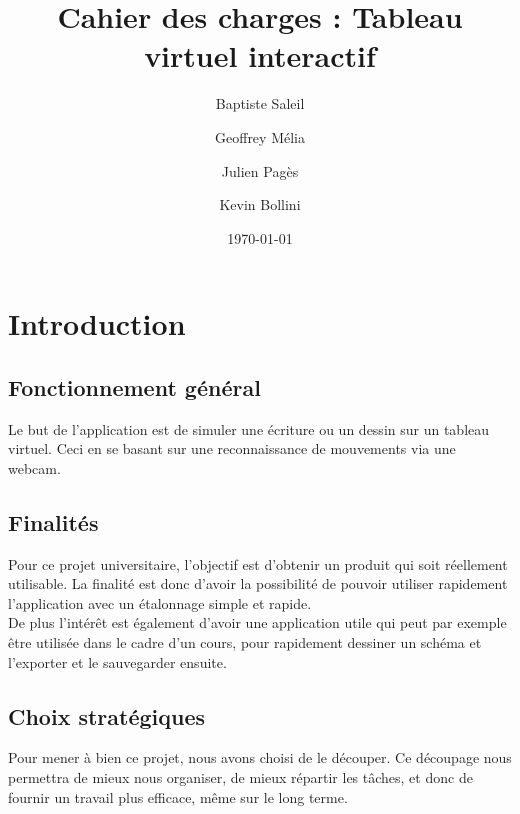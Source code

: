 \documentclass{article}
\title{Cahier des charges : Tableau virtuel interactif}
\author{Baptiste Saleil \and Geoffrey Mélia \and Julien Pagès \and Kevin Bollini}
\date{\today}
\begin{document}
	\maketitle
	\thispagestyle{empty}
	\newpage
	
	\tableofcontents
	\newpage
	
	\section{Introduction}
		\subsection{Fonctionnement général}
			Le but de l'application est de simuler une écriture ou un dessin sur un tableau virtuel. Ceci en se basant 
		sur une reconnaissance de mouvements via une webcam.
		\subsection{Finalités}
			Pour ce projet universitaire, l'objectif est d'obtenir un produit qui soit réellement utilisable.
La finalité est donc d'avoir la possibilité de pouvoir utiliser rapidement l'application avec un étalonnage simple et rapide.\\
De plus l'intérêt est également d'avoir une application utile qui peut par exemple être utilisée dans le cadre d'un cours,
pour rapidement dessiner un schéma et l'exporter et le sauvegarder ensuite. \\
\subsection{Choix stratégiques}
			Pour mener à bien ce projet, nous avons choisi de le découper.
			Ce découpage nous permettra de mieux nous organiser, de mieux répartir les tâches, et donc de fournir un travail plus efficace, même sur le long terme.
\end{document}
